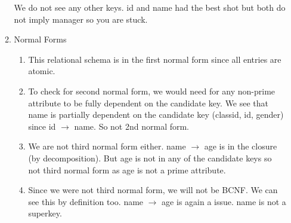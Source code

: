 \documentclass[11pt]{article}
\begin{document}
\begin{enumerate}
\begin{enumerate}
We do not see any other keys.  id and name had the best shot but both do not imply manager so you are stuck.
\item Normal Forms
\begin{enumerate}
\item This relational schema is in the first normal form since all entries are atomic.
\item To check for second normal form, we would need for any non-prime attribute to be fully dependent on the candidate key.  We see that name is partially dependent on the candidate key (classid, id, gender) since id $\rightarrow$ name.  So not 2nd normal form.
\item We are not third normal form either.  name $\rightarrow$ age is in the closure (by decomposition).  But age is not in any of the candidate keys so not third normal form as age is not a prime attribute.
\item Since we were not third normal form, we will not be BCNF.  We can see this by definition too.  name $\rightarrow$ age is again a issue.  name is not a superkey. 
\end{enumerate}
%
%
%
%
%
%
%
%
%
%
%
%
%
%
%


\end{enumerate}
\end{enumerate}
\end{document}
